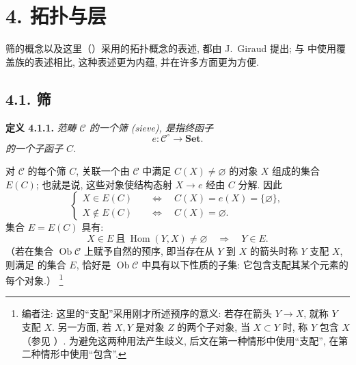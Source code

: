
\section*{4. 拓扑与层}

筛的概念以及这里（）采用的拓扑概念的表述,
都由 J.~Giraud  提出;
与  中使用覆盖族的表述相比,
这种表述更为内蕴, 并在许多方面更为方便.

\subsection*{4.1. 筛}

\medskip
\noindent{}\textbf{定义 4.1.1.}
\textit{范畴 \(\mathscr C\) 的一个\emph{筛 (sieve)}, 是指终函子}
\[
  e:\mathscr C^{\circ}\longrightarrow\mathbf{Set}.
\]
\textit{的一个子函子 \(C\).}

对 \(\mathscr C\) 的每个筛 \(C\), 关联一个由 \(\mathscr C\) 中满足
\(C(X)\ne\varnothing\) 的对象 \(X\) 组成的集合 \(E(C)\);
也就是说, 这些对象使结构态射 \(X\to e\) 经由 \(C\) 分解. 因此
\[
\tag{+}\label{sga3:iv:definition:4:1:1:eq:unnamed:01}
\left\{
\begin{aligned}
 X\in E(C)&\quad\Longleftrightarrow\quad C(X)=e(X)=\{\varnothing\},\\
 X\notin E(C)&\quad\Longleftrightarrow\quad C(X)=\varnothing.
\end{aligned}
\right.
\]
集合 \(E=E(C)\) 具有:
\[
\tag{++}\label{sga3:iv:definition:4:1:1:eq:unnamed:02}
 X\in E\ \text{且}\ \operatorname{Hom}(Y,X)\ne\varnothing
 \quad\Longrightarrow\quad Y\in E.
\]
（若在集合 \(\operatorname{Ob}\mathscr C\) 上赋予自然的预序,
即当存在从 \(Y\) 到 \(X\) 的箭头时称 \(Y\) 支配 \(X\),
则满足 
的集合 \(E\), 恰好是 \(\operatorname{Ob}\mathscr C\) 中具有以下性质的子集:
它包含支配其某个元素的每个对象.）
\footnote{编者注: 这里的“支配”采用刚才所述预序的意义:
若存在箭头 \(Y\to X\), 就称 \(Y\) 支配 \(X\).
另一方面, 若 \(X,Y\) 是对象 \(Z\) 的两个子对象,
当 \(X\subset Y\) 时, 称 \(Y\) 包含 \(X\)
（参见 ）.
为避免这两种用法产生歧义, 后文在第一种情形中使用“支配”, 在第二种情形中使用“包含”.}


